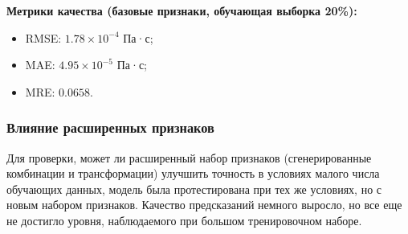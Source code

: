 \documentclass[a4paper,12pt]{article}
\begin{document}
      \begin{minipage}{\textwidth}
        \textbf{Метрики качества (базовые признаки, обучающая выборка 20\%):}
        \begin{itemize}
          \item RMSE: \( 1.78 \times 10^{-4} \) Па·с;
          \item MAE: \( 4.95 \times 10^{-5} \) Па·с;
          \item MRE: \( 0.0658 \).
        \end{itemize}
      \end{minipage}

    \subsubsection{Влияние расширенных признаков}

      Для проверки, может ли расширенный набор признаков (сгенерированные комбинации и трансформации) улучшить точность в условиях малого числа обучающих данных, модель была протестирована при тех же условиях, но с новым набором признаков. Качество предсказаний немного выросло, но все еще не достигло уровня, наблюдаемого при большом тренировочном наборе.
      
\end{document}
